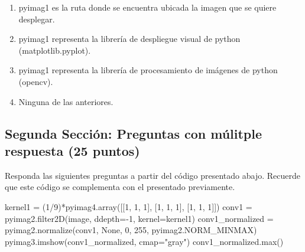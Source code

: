 \documentclass[12pt,a4paper]{article}
\newenvironment{Shaded}{\begin{snugshade}}{\end{snugshade}}
\newcommand{\BuiltInTok}[1]{\textcolor[rgb]{0.00,0.23,0.31}{#1}}
\newcommand{\DecValTok}[1]{\textcolor[rgb]{0.68,0.00,0.00}{#1}}
\newcommand{\NormalTok}[1]{\textcolor[rgb]{0.00,0.23,0.31}{#1}}
\newcommand{\OperatorTok}[1]{\textcolor[rgb]{0.37,0.37,0.37}{#1}}
\newcommand{\StringTok}[1]{\textcolor[rgb]{0.13,0.47,0.30}{#1}}
\newcommand{\VariableTok}[1]{\textcolor[rgb]{0.07,0.07,0.07}{#1}}
\providecommand{\tightlist}{%
  \setlength{\itemsep}{0pt}\setlength{\parskip}{0pt}}\usepackage{longtable,booktabs,array}
\providecommand{\tightlist}{%
  \setlength{\itemsep}{0pt}\setlength{\parskip}{2pt}}
\begin{document}
\begin{enumerate}
  \begin{enumerate}
  \tightlist
  \item
    pyimag1 es la ruta donde se encuentra ubicada la imagen que se
    quiere desplegar.
  \item
    pyimag1 representa la librería de despliegue visual de python
    (matplotlib.pyplot).
  \item
    pyimag1 representa la librería de procesamiento de imágenes de
    python (opencv).
  \item
    Ninguna de las anteriores.
  \end{enumerate}
\end{enumerate}

\subsection{Segunda Sección: Preguntas con múlitple respuesta (25
puntos)}\label{segunda-secciuxf3n-preguntas-con-muxfalitple-respuesta-25-puntos}

Responda las siguientes preguntas a partir del código presentado abajo.
Recuerde que este código se complementa con el presentado previamente.

\label{segunda-secciuxf3n}
\begin{Shaded}
\begin{Highlighting}[]
\NormalTok{kernel1 }\OperatorTok{=}\NormalTok{ (}\DecValTok{1}\OperatorTok{/}\DecValTok{9}\NormalTok{)}\OperatorTok{*}\NormalTok{pyimag4.array([[}\DecValTok{1}\NormalTok{, }\DecValTok{1}\NormalTok{, }\DecValTok{1}\NormalTok{], [}\DecValTok{1}\NormalTok{, }\DecValTok{1}\NormalTok{, }\DecValTok{1}\NormalTok{], [}\DecValTok{1}\NormalTok{, }\DecValTok{1}\NormalTok{, }\DecValTok{1}\NormalTok{]])}
\NormalTok{conv1 }\OperatorTok{=}\NormalTok{ pyimag2.filter2D(image, ddepth}\OperatorTok{={-}}\DecValTok{1}\NormalTok{, kernel}\OperatorTok{=}\NormalTok{kernel1)}
\NormalTok{conv1\_normalized }\OperatorTok{=}\NormalTok{ pyimag2.normalize(conv1, }\VariableTok{None}\NormalTok{, }\DecValTok{0}\NormalTok{, }\DecValTok{255}\NormalTok{, pyimag2.NORM\_MINMAX)}
\NormalTok{pyimag3.imshow(conv1\_normalized, cmap}\OperatorTok{=}\StringTok{"gray"}\NormalTok{)}
\NormalTok{conv1\_normalized.}\BuiltInTok{max}\NormalTok{()}
\end{Highlighting}
\end{Shaded}
\end{document}
